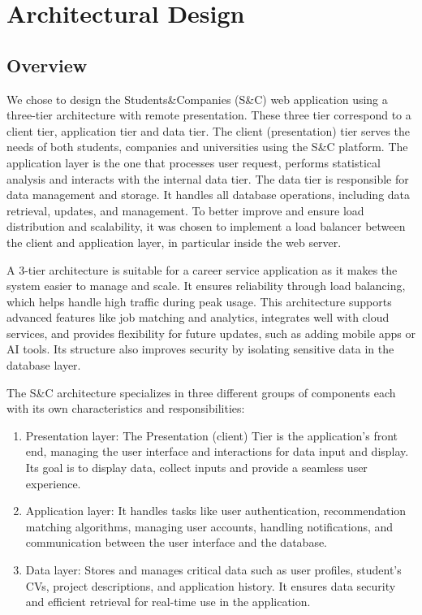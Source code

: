\chapter{Architectural Design}

\section{Overview}
We chose to design the Students\&Companies (S\&C) web application using a three-tier architecture with remote presentation. These three tier correspond to a client tier, application tier and data tier. The client (presentation) tier serves the needs of both students, companies and universities using the S\&C platform. The application layer is the one that processes user request, performs statistical analysis and interacts with the internal data tier. The data tier is responsible for data management and storage. It handles all database operations, including data retrieval, updates, and management. To better improve and ensure load distribution and scalability, it was chosen to implement a load balancer between the client and application layer, in particular inside the web server.

A 3-tier architecture is suitable for a career service application as it makes the system easier to manage and scale. It ensures reliability through load balancing, which helps handle high traffic during peak usage. This architecture supports advanced features like job matching and analytics, integrates well with cloud services, and provides flexibility for future updates, such as adding mobile apps or AI tools. Its structure also improves security by isolating sensitive data in the database layer.

The S\&C architecture specializes in three different groups of components each with its own characteristics and responsibilities:
\begin{enumerate}
    \item Presentation layer: The Presentation (client) Tier is the application's front end, managing the user interface and interactions for data input and display. Its goal is to display data, collect inputs and provide a seamless user experience. 
    \item Application layer: It handles tasks like user authentication, recommendation matching algorithms, managing user accounts, handling notifications, and communication between the user interface and the database.
    \item Data layer: Stores and manages critical data such as user profiles, student's CVs, project descriptions, and application history. It ensures data security and efficient retrieval for real-time use in the application.
\end{enumerate}

